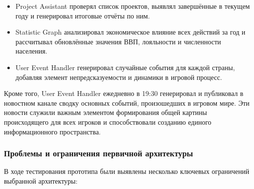 \begin{itemize}
    \item Project Assistant проверял список проектов, выявлял завершённые в текущем году и генерировал итоговые отчёты по ним.

    \item Statistic Graph анализировал экономическое влияние всех действий за год и рассчитывал обновлённые значения ВВП, лояльности и численности населения.

    \item User Event Handler генерировал случайные события для каждой страны, добавляя элемент непредсказуемости и динамики в игровой процесс.
\end{itemize}

Кроме того, User Event Handler ежедневно в 19:30 генерировал и публиковал в новостном канале сводку основных событий, произошедших в игровом мире. Эти новости служили важным элементом формирования общей картины происходящего для всех игроков и способствовали созданию единого информационного пространства.

\subsubsection{Проблемы и ограничения первичной архитектуры}

В ходе тестирования прототипа были выявлены несколько ключевых ограничений выбранной архитектуры:


